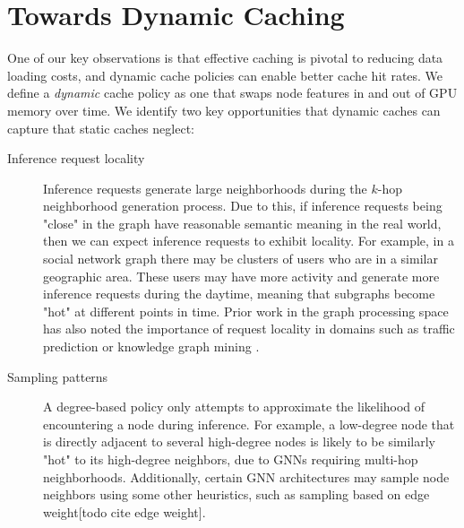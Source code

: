 

\section{Towards Dynamic Caching} \label{Design: Towards Dynamic Caching}
One of our key observations is that effective caching is pivotal to reducing data loading costs, and dynamic cache policies can enable better cache hit rates.
We define a \textit{dynamic} cache policy as one that swaps node features in and out of GPU memory over time. We identify two key opportunities  that dynamic caches can capture that static caches neglect:
\begin{description}
    \item[Inference request locality] Inference requests generate large neighborhoods during the $k$-hop neighborhood generation process. Due to this, if inference requests being "close" in the graph have reasonable semantic meaning in the real world, then we can expect inference requests to exhibit locality. For example, in a social network graph there may be clusters of users who are in a similar geographic area. These users may have more activity and generate more inference requests during the daytime, meaning that subgraphs become "hot" at different points in time. Prior work in the graph processing space has also noted the importance of request locality in domains such as traffic prediction or knowledge graph mining \cite{QGraph_2018}.
    \item[Sampling patterns] A degree-based policy only attempts to approximate the likelihood of encountering a node during inference. For example, a low-degree node that is directly adjacent to several high-degree nodes is likely to be similarly "hot" to its high-degree neighbors, due to GNNs requiring multi-hop neighborhoods. Additionally, certain GNN architectures may sample node neighbors using some other heuristics, such as sampling based on edge weight[todo cite edge weight].
\end{description}

